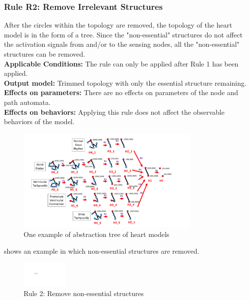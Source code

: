 \subsubsection{Rule R2: Remove Irrelevant Structures}
After the circles within the topology are removed, the topology of the heart model is in the form of a tree. Since the "non-essential" structures do not affect the activation signals from and/or to the sensing nodes, all the "non-essential" structures can be removed.\\
\textbf{Applicable Conditions: }The rule can only be applied after Rule 1 has been applied.\\
\textbf{Output model: } Trimmed topology with only the essential structure remaining.\\
\textbf{Effects on parameters: } There are no effects on parameters of the node and path automata.\\
\textbf{Effects on behaviors: } Applying this rule does not affect the observable behaviors of the model.
 \begin{figure}[!t]
	\centering
	\includegraphics[width=0.8\textwidth]{figs/abs_tree.pdf}
	\caption{\small One example of abstraction tree of heart models}
	\vspace{-15pt}
	\label{fig:HM_abs}
\end{figure}

 shows an example in which non-essential structures are removed.
\begin{figure}[!h]
	\centering
	\includegraphics[width=0.2\textwidth]{figs/rule2.pdf}
	\vspace{-10pt}
	\caption{\small Rule 2: Remove non-essential structures}
	\vspace{-10pt}
	\label{fig:rule2}
\end{figure}

